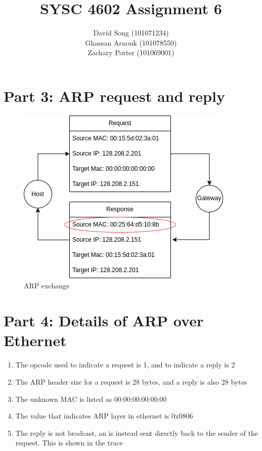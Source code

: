 \documentclass{article}
\begin{document}
    \title  { \textbf{SYSC 4602 Assignment 6} }
    \author {
        David Song (101071234)\\
        Ghassan Arnouk (101078550)\\
        Zachary Porter (101069001)
    }

    \maketitle

    \clearpage
    \section*{Part 3: ARP request and reply}
    \begin{figure}[htbp]
        \centering
        \includegraphics[width=\textwidth]{images/part3.drawio.png}
        \caption{ARP exchange}
    \end{figure}
    \clearpage
    \section*{Part 4: Details of ARP over Ethernet}
    \begin{enumerate}
        \item The opcode used to indicate a request is 1, and to indicate a reply is 2
        \item The ARP header size for a request is 28 bytes, and a reply is also 28 bytes
        \item The unknown MAC is listed as 00:00:00:00:00:00
        \item The value that indicates ARP layer in ethernet is 0x0806
        \item The reply is not brodcast, an is instead sent directly back to the sender of the request. This is shown in the trace
    \end{enumerate}
\end{document}

